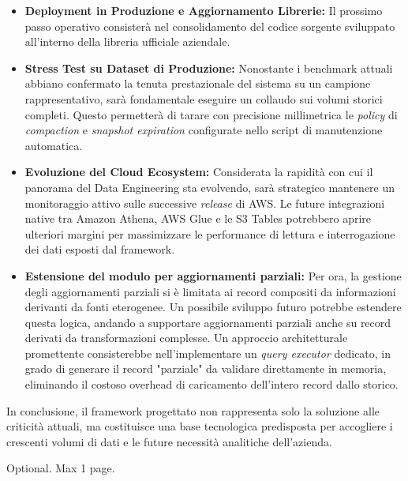 \documentclass[12pt,a4paper,openright,twoside]{book}
\begin{document}
\begin{itemize}
    \item \textbf{Deployment in Produzione e Aggiornamento Librerie:} Il prossimo passo operativo consisterà nel consolidamento del codice sorgente sviluppato all'interno della libreria ufficiale aziendale. 
    
    \item \textbf{Stress Test su Dataset di Produzione:} Nonostante i benchmark attuali abbiano confermato la tenuta prestazionale del sistema su un campione rappresentativo, sarà fondamentale eseguire un collaudo sui volumi storici completi. Questo permetterà di tarare con precisione millimetrica le \textit{policy} di \textit{compaction} e \textit{snapshot expiration} configurate nello script di manutenzione automatica.
    
    \item \textbf{Evoluzione del Cloud Ecosystem:} Considerata la rapidità con cui il panorama del Data Engineering sta evolvendo, sarà strategico mantenere un monitoraggio attivo sulle successive \textit{release} di AWS. Le future integrazioni native tra Amazon Athena, AWS Glue e le S3 Tables potrebbero aprire ulteriori margini per massimizzare le performance di lettura e interrogazione dei dati esposti dal framework.

    \item \textbf{Estensione del modulo per aggiornamenti parziali:} Per ora, la gestione degli aggiornamenti parziali si è limitata ai record compositi da informazioni derivanti da fonti eterogenee. Un possibile sviluppo futuro potrebbe estendere questa logica, andando a supportare aggiornamenti parziali anche su record derivati da transformazioni complesse. Un approccio architetturale promettente consisterebbe nell'implementare un \textit{query executor} dedicato, in grado di generare il record "parziale" da validare direttamente in memoria, eliminando il costoso overhead di caricamento dell'intero record dallo storico.
\end{itemize}

In conclusione, il framework progettato non rappresenta solo la soluzione alle criticità attuali, ma costituisce una base tecnologica predisposta per accogliere i crescenti volumi di dati e le future necessità analitiche dell'azienda.


\backmatter




\begin{acknowledgements} %
Optional. Max 1 page.
\end{acknowledgements}
\end{document}
